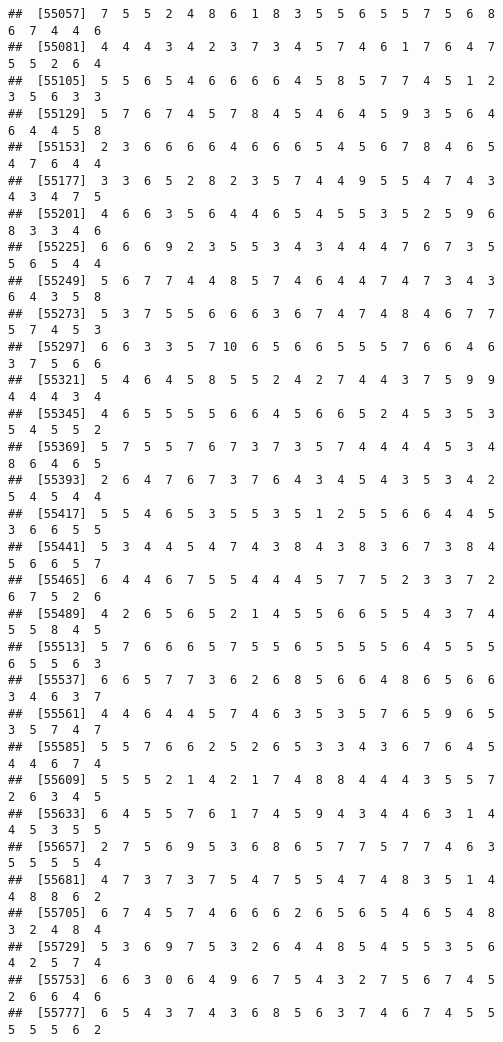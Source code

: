 \documentclass[
]{book}
\begin{document}
\begin{verbatim}
##  [55057]  7  5  5  2  4  8  6  1  8  3  5  5  6  5  5  7  5  6  8  6  7  4  4  6
##  [55081]  4  4  4  3  4  2  3  7  3  4  5  7  4  6  1  7  6  4  7  5  5  2  6  4
##  [55105]  5  5  6  5  4  6  6  6  6  4  5  8  5  7  7  4  5  1  2  3  5  6  3  3
##  [55129]  5  7  6  7  4  5  7  8  4  5  4  6  4  5  9  3  5  6  4  6  4  4  5  8
##  [55153]  2  3  6  6  6  6  4  6  6  6  5  4  5  6  7  8  4  6  5  4  7  6  4  4
##  [55177]  3  3  6  5  2  8  2  3  5  7  4  4  9  5  5  4  7  4  3  4  3  4  7  5
##  [55201]  4  6  6  3  5  6  4  4  6  5  4  5  5  3  5  2  5  9  6  8  3  3  4  6
##  [55225]  6  6  6  9  2  3  5  5  3  4  3  4  4  4  7  6  7  3  5  5  6  5  4  4
##  [55249]  5  6  7  7  4  4  8  5  7  4  6  4  4  7  4  7  3  4  3  6  4  3  5  8
##  [55273]  5  3  7  5  5  6  6  6  3  6  7  4  7  4  8  4  6  7  7  5  7  4  5  3
##  [55297]  6  6  3  3  5  7 10  6  5  6  6  5  5  5  7  6  6  4  6  3  7  5  6  6
##  [55321]  5  4  6  4  5  8  5  5  2  4  2  7  4  4  3  7  5  9  9  4  4  4  3  4
##  [55345]  4  6  5  5  5  5  6  6  4  5  6  6  5  2  4  5  3  5  3  5  4  5  5  2
##  [55369]  5  7  5  5  7  6  7  3  7  3  5  7  4  4  4  4  5  3  4  8  6  4  6  5
##  [55393]  2  6  4  7  6  7  3  7  6  4  3  4  5  4  3  5  3  4  2  5  4  5  4  4
##  [55417]  5  5  4  6  5  3  5  5  3  5  1  2  5  5  6  6  4  4  5  3  6  6  5  5
##  [55441]  5  3  4  4  5  4  7  4  3  8  4  3  8  3  6  7  3  8  4  5  6  6  5  7
##  [55465]  6  4  4  6  7  5  5  4  4  4  5  7  7  5  2  3  3  7  2  6  7  5  2  6
##  [55489]  4  2  6  5  6  5  2  1  4  5  5  6  6  5  5  4  3  7  4  5  5  8  4  5
##  [55513]  5  7  6  6  6  5  7  5  5  6  5  5  5  5  6  4  5  5  5  6  5  5  6  3
##  [55537]  6  6  5  7  7  3  6  2  6  8  5  6  6  4  8  6  5  6  6  3  4  6  3  7
##  [55561]  4  4  6  4  4  5  7  4  6  3  5  3  5  7  6  5  9  6  5  3  5  7  4  7
##  [55585]  5  5  7  6  6  2  5  2  6  5  3  3  4  3  6  7  6  4  5  4  4  6  7  4
##  [55609]  5  5  5  2  1  4  2  1  7  4  8  8  4  4  4  3  5  5  7  2  6  3  4  5
##  [55633]  6  4  5  5  7  6  1  7  4  5  9  4  3  4  4  6  3  1  4  4  5  3  5  5
##  [55657]  2  7  5  6  9  5  3  6  8  6  5  7  7  5  7  7  4  6  3  5  5  5  5  4
##  [55681]  4  7  3  7  3  7  5  4  7  5  5  4  7  4  8  3  5  1  4  4  8  8  6  2
##  [55705]  6  7  4  5  7  4  6  6  6  2  6  5  6  5  4  6  5  4  8  3  2  4  8  4
##  [55729]  5  3  6  9  7  5  3  2  6  4  4  8  5  4  5  5  3  5  6  4  2  5  7  4
##  [55753]  6  6  3  0  6  4  9  6  7  5  4  3  2  7  5  6  7  4  5  2  6  6  4  6
##  [55777]  6  5  4  3  7  4  3  6  8  5  6  3  7  4  6  7  4  5  5  5  5  5  6  2

\end{verbatim}
\end{document}
